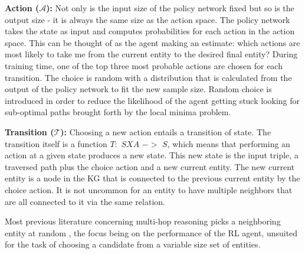\noindent\textbf{Action ($\mathcal{A}$): }
Not only is the input size of the policy network fixed but so is the output size - it is always the same size as the action space. The policy network takes the state as input and computes probabilities for each action in the action space. This can be thought of as the agent making an estimate: which actions are most likely to take me from the current entity to the desired final entity?
During training time, one of the top three most probable actions are chosen for each transition. The choice is random with a distribution that is calculated from the output of the policy network to fit the new sample size. %
Random choice is introduced in order to reduce the likelihood of the agent getting stuck looking for sub-optimal paths brought forth by the local minima problem. %

\noindent\textbf{Transition ($\mathcal{T}$): }
Choosing a new action entails a transition of state. The transition itself is a function $T:$ $S X A$ $->$ $S$, which means that performing an action at a given state produces a new state. This new state is the input triple, a traversed path plus the choice action and a new current entity. The new current entity is a node in the KG that is connected to the previous current entity by the choice action. It is not uncommon for an entity to have multiple neighbors that are all connected to it via the same relation. %

Most previous literature concerning multi-hop reasoning picks a neighboring entity at random \cite{Xiong2017, Das2017}, the focus being on the performance of the RL agent, unsuited for the task of choosing a candidate from a variable size set of entities.

